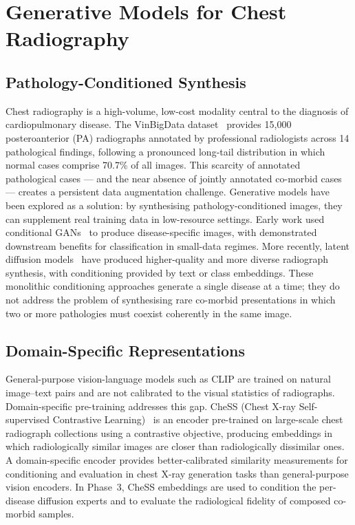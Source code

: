 
\section{Generative Models for Chest Radiography}
\label{sec:medical_imaging_background}

\subsection{Pathology-Conditioned Synthesis}

Chest radiography is a high-volume, low-cost modality central to the diagnosis of
cardiopulmonary disease. The VinBigData dataset~\citep{nguyen2022vindr} provides
15{,}000 posteroanterior (PA) radiographs annotated by professional radiologists
across 14 pathological findings, following a pronounced long-tail distribution in
which normal cases comprise 70.7\% of all images. This scarcity of annotated
pathological cases --- and the near absence of jointly annotated co-morbid cases ---
creates a persistent data augmentation challenge. Generative models have been
explored as a solution: by synthesising pathology-conditioned images, they can
supplement real training data in low-resource settings. Early work used conditional
GANs~\citep{gan_medical_image_augmentation_2018, medical_image_synthesis_gans_2018}
to produce disease-specific images, with demonstrated downstream benefits for
classification in small-data regimes. More recently, latent diffusion
models~\citep{rombach2022high} have produced higher-quality and more diverse
radiograph synthesis, with conditioning provided by text or class embeddings. These
monolithic conditioning approaches generate a single disease at a time; they do not
address the problem of synthesising rare co-morbid presentations in which two or more
pathologies must coexist coherently in the same image.

\subsection{Domain-Specific Representations}

General-purpose vision-language models such as CLIP are trained on natural image--text
pairs and are not calibrated to the visual statistics of radiographs. Domain-specific
pre-training addresses this gap. CheSS (Chest X-ray Self-supervised Contrastive
Learning)~\citep{NEURIPS2022_123d3e81} is an encoder pre-trained on large-scale chest
radiograph collections using a contrastive objective, producing embeddings in which
radiologically similar images are closer than radiologically dissimilar ones.
A domain-specific encoder provides better-calibrated similarity measurements for
conditioning and evaluation in chest X-ray generation tasks than general-purpose
vision encoders. In Phase~3, CheSS embeddings are used to condition the per-disease
diffusion experts and to evaluate the radiological fidelity of composed co-morbid
samples.
